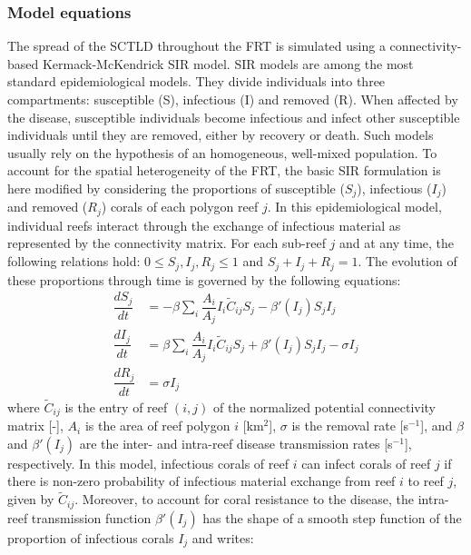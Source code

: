 \documentclass[utf8]{frontiersSCNS}
\begin{document}
\subsubsection{Model equations}
The spread of the SCTLD throughout the FRT is simulated using a connectivity-based Kermack-McKendrick SIR model. SIR models are among the most standard epidemiological models. They divide individuals into three compartments: susceptible (S), infectious (I) and removed (R). When affected by the disease, susceptible individuals become infectious and infect other susceptible individuals until they are removed, either by recovery or death. Such models usually rely on the hypothesis of an homogeneous, well-mixed population. To account for the spatial heterogeneity of the FRT, the basic SIR formulation is here modified by considering the proportions of susceptible ($S_j$), infectious ($I_j$) and removed ($R_j$) corals of each polygon reef $j$. In this epidemiological model, individual reefs interact through the exchange of infectious material as represented by the connectivity matrix. For each sub-reef $j$ and at any time, the following relations hold: $0\leq S_j,I_j,R_j\leq 1$ and $S_j+I_j+R_j=1$. The evolution of these proportions through time is governed by the following equations:
\begin{equation}
    \begin{aligned}
        \dfrac{dS_j}{dt} &= -\beta\sum_i\dfrac{A_i}{A_j}I_i\tilde{C}_{ij}S_j - \beta'(I_j)S_jI_j \\
        \dfrac{dI_j}{dt} &= \beta\sum_i\dfrac{A_i}{A_j}I_i\tilde{C}_{ij}S_j + \beta'(I_j)S_jI_j - \sigma I_j \\
        \dfrac{dR_j}{dt} &= \sigma I_j
    \end{aligned}\label{eq:epidemio}
\end{equation}
where $\tilde{C}_{ij}$ is the entry of reef $(i,j)$ of the normalized potential connectivity matrix [-], $A_i$ is the area of reef polygon $i$ [km$^2$], $\sigma$ is the removal rate [s$^{-1}$], and $\beta$ and $\beta'(I_j)$ are the inter- and intra-reef disease transmission rates [s$^{-1}$], respectively. In this model, infectious corals of reef $i$ can infect corals of reef $j$ if there is non-zero probability of infectious material exchange from reef $i$ to reef $j$, given by $\tilde{C}_{ij}$. Moreover, to account for coral resistance to the disease, the intra-reef transmission function $\beta'(I_j)$ has the shape of a smooth step function of the proportion of infectious corals $I_j$ and writes:
\end{document}
